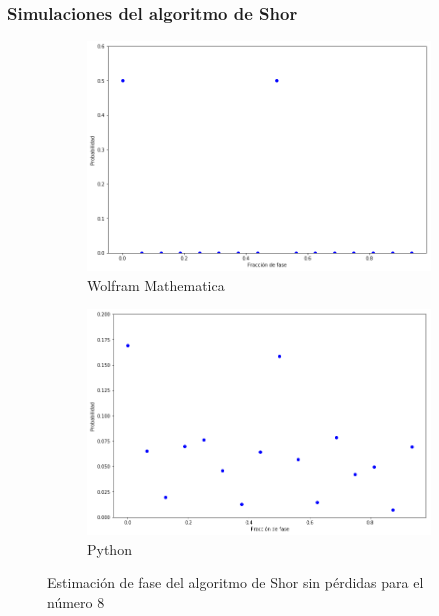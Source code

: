 \documentclass[xetex,mathserif,serif, 8pt]{beamer}
\begin{document}
\begin{frame}
    \frametitle{Simulaciones del algoritmo de Shor}

\begin{figure}[H]
    \centering
    \begin{subfigure}[m]{0.47\textwidth}
        \centering
        \includegraphics[width=0.95\linewidth]{img/ShorM8.png}
        \caption{Wolfram Mathematica}
    \end{subfigure}
    \begin{subfigure}[m]{0.47\textwidth}
        \centering
        \includegraphics[width=0.95\linewidth]{img/shor2lossless.png}
        \caption{Python}
    \end{subfigure}
    \caption{Estimación de fase del algoritmo de Shor sin pérdidas para el número 8}
    \label{fig:shor8}
\end{figure}

\end{frame}
\end{document}
